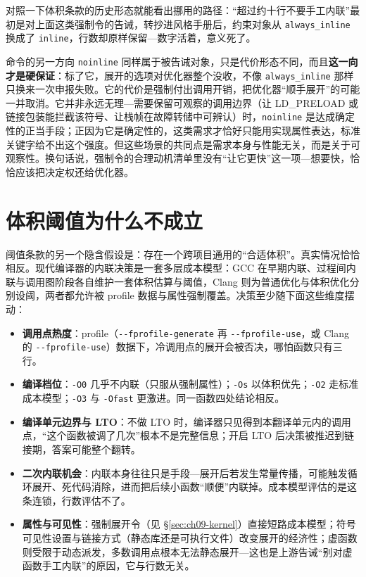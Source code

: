 \documentclass[12pt,a4paper,fontset=fandol]{ctexbook}
\newcommand{\Tp}[1]{\texttt{#1}}
\newcommand{\Opt}[1]{\texttt{-\/-#1}}
\newcommand{\Bk}{\discretionary{}{}{}}
\begin{document}
对照一下体积条款的历史形态就能看出挪用的路径：``超过约十行不要手工内联''最初是对上面这类强制令的告诫，转抄进风格手册后，约束对象从 \Tp{always\_inline} 换成了 \Tp{inline}，行数却原样保留---数字活着，意义死了。

命令的另一方向 \Tp{noinline} 同样属于被告诫对象，只是代价形态不同，而且\textbf{这一向才是硬保证}：标了它，展开的选项对优化器整个没收，不像 \Tp{always\_inline} 那样只换来一次申报失败。它的代价是强制付出调用开销，把优化器``顺手展开''的可能一并取消。它并非永远无理---需要保留可观察的调用边界（让 LD\_PRELOAD 或链接包装能拦截该符号、让栈帧在故障转储中可辨认）时，\Tp{noinline} 是达成确定性的正当手段；正因为它是确定性的，这类需求才恰好只能用实现属性表达，标准关键字给不出这个强度。但这些场景的共同点是需求本身与性能无关，而是关于可观察性。换句话说，强制令的合理动机清单里没有``让它更快''这一项---想要快，恰恰应该把决定权还给优化器。

\section{体积阈值为什么不成立}
\label{sec:ch09-costmodel}

阈值条款的另一个隐含假设是：存在一个跨项目通用的``合适体积''。真实情况恰恰相反。现代编译器的内联决策是一套多层成本模型：GCC 在早期内联、过程间内联与调用图阶段各自维护一套体积估算与阈值，Clang 则为普通优化与体积优化分别设阈，两者都允许被 profile 数据与属性强制覆盖。决策至少随下面这些维度摆动：

\begin{itemize}
  \item \textbf{调用点热度}：profile（\Opt{fprofile-{\Bk}generate} 再 \Opt{fprofile-{\Bk}use}，或 Clang 的 \Opt{fprofile-{\Bk}use}）数据下，冷调用点的展开会被否决，哪怕函数只有三行。
  \item \textbf{编译档位}：\Tp{-O0} 几乎不内联（只服从强制属性）；\Tp{-Os} 以体积优先；\Tp{-O2} 走标准成本模型；\Tp{-O3} 与 \Tp{-Ofast} 更激进。同一函数四处结论相反。
  \item \textbf{编译单元边界与 LTO}：不做 LTO 时，编译器只见得到本翻译单元内的调用点，``这个函数被调了几次''根本不是完整信息；开启 LTO 后决策被推迟到链接期，答案可能整个翻转。
  \item \textbf{二次内联机会}：内联本身往往只是手段---展开后若发生常量传播，可能触发循环展开、死代码消除，进而把后续小函数``顺便''内联掉。成本模型评估的是这条连锁，行数评估不了。
  \item \textbf{属性与可见性}：强制展开令（见 \S\ref{sec:ch09-kernel}）直接短路成本模型；符号可见性设置与链接方式（静态库还是可执行文件）改变展开的经济性；虚函数则受限于动态派发，多数调用点根本无法静态展开---这也是上游告诫``别对虚函数手工内联''的原因，它与行数无关。
\end{itemize}
\end{document}
